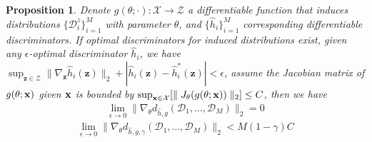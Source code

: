 \documentclass{article} \usepackage{iclr2023_conference,times}
\newtheorem{prop}{Proposition}
\newcommand{\z}{\mathbf{z}}
\newcommand{\D}{\mathcal{D}}
\begin{document}
\begin{prop}
Denote $g(\theta;\cdot):\mathcal{X}\rightarrow\mathcal{Z}$ a differentiable function that induces distributions $\{\D^z_i\}_{i=1}^M$ with parameter $\theta$, and $\{\hat{h}_i\}_{i=1}^M$ corresponding differentiable discriminators. If optimal discriminators for induced distributions exist, given any $\epsilon$-optimal discriminator $\hat{h}_i$, we have $\sup_{\z\in\mathcal{Z}}\parallel \nabla_\z\hat{h}_i(\z)\parallel_2+|\hat{h}_i(\z)-\hat{h}_i^*(\z)|<\epsilon$, assume the Jacobian matrix of $g(\theta;\mathbf{x})$ given $\mathbf{x}$ is bounded by $\sup_{\mathbf{x}\in\mathcal{X}}[\parallel J_\theta(g(\theta;\mathbf{x}))\parallel_2]\leq C $, then we have 
\begin{equation}
\begin{aligned}
\lim_{\epsilon\rightarrow0}\parallel\nabla_\theta d_{\hat{h}, g}(\D_1,\dots,\D_M) \parallel_2=0
\end{aligned}\end{equation}
\begin{equation}
\begin{aligned}
\lim_{\epsilon\rightarrow0} \parallel\nabla_\theta d_{\hat{h},g,\gamma}(\D_1,\dots,\D_M) \parallel_2<{M}(1-\gamma)C
\end{aligned}\end{equation}
\label{prop:stable_md}
\end{prop}
\end{document}
